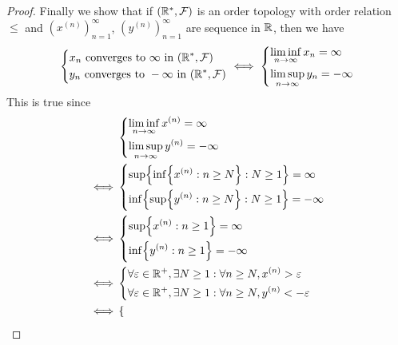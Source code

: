 \begin{proof}
  Finally we show that if  \((\mathbb{R}^*, \mathcal{F})\) is an order topology with order relation \(\leq\) and \((x^{(n)})_{n = 1}^\infty\), \((y^{(n)})_{n = 1}^\infty\) are sequence in \(\mathbb{R}\), then we have
  \[
    \begin{dcases}
      x_n \text{ converges to } \infty \text{ in } (\mathbb{R}^*, \mathcal{F})  \\
      y_n \text{ converges to } -\infty \text{ in } (\mathbb{R}^*, \mathcal{F}) \\
    \end{dcases} \iff \begin{dcases}
      \liminf_{n \to \infty} x_n = \infty \\
      \limsup_{n \to \infty} y_n = -\infty
    \end{dcases}
  \]
  This is true since
  \begin{align*}
         & \begin{dcases}
             \liminf_{n \to \infty} x^{(n)} = \infty \\
             \limsup_{n \to \infty} y^{(n)} = -\infty
           \end{dcases}                                                                                        \\
    \iff & \begin{dcases}
             \sup\set{\inf\set{x^{(n)} : n \geq N} : N \geq 1} = \infty \\
             \inf\set{\sup\set{y^{(n)} : n \geq N} : N \geq 1} = -\infty
           \end{dcases}                                                                    \\
    \iff & \begin{dcases}
             \sup\set{x^{(n)} : n \geq 1} = \infty \\
             \inf\set{y^{(n)} : n \geq 1} = -\infty
           \end{dcases}                                                                 \\
    \iff & \begin{dcases}
             \forall \varepsilon \in \R^+, \exists N \geq 1 : \forall n \geq N, x^{(n)} > \varepsilon \\
             \forall \varepsilon \in \R^+, \exists N \geq 1 : \forall n \geq N, y^{(n)} < -\varepsilon
           \end{dcases}                                       \\
    \iff & \begin{dcases}

\end{dcases}
\end{align*}
\end{proof}
